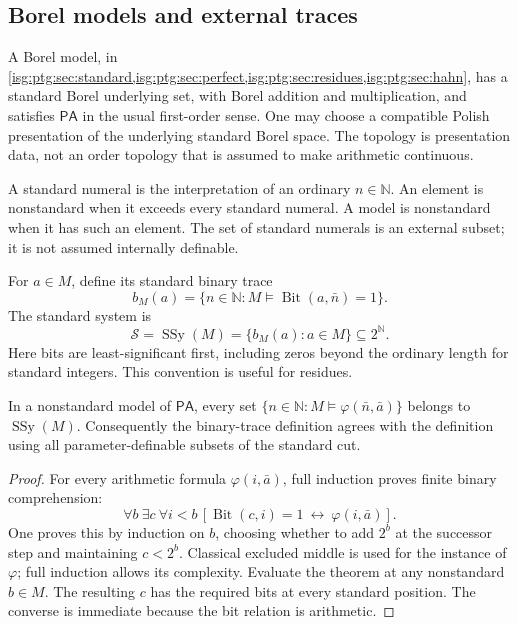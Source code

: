 \documentclass[11pt]{article}
\theoremstyle{definition}
\theoremstyle{remark}
\newcommand{\N}{\mathbb{N}}
\newcommand{\PA}{\mathsf{PA}}
\newcommand{\SSy}{\operatorname{SSy}}
\newcommand{\Bit}{\operatorname{Bit}}
\begin{document}
\subsection{Borel models and external traces}\label{isg:ptg:sec:traces}
A Borel model, in \cref{isg:ptg:sec:standard,isg:ptg:sec:perfect,isg:ptg:sec:residues,isg:ptg:sec:hahn},
has a standard Borel underlying set, with Borel addition and
multiplication, and satisfies $\PA$ in the usual first-order sense. One may
choose a compatible Polish presentation of the underlying standard Borel
space. The topology is presentation data, not an order topology that is
assumed to make arithmetic continuous.

A standard numeral is the interpretation of an ordinary $n\in\N$. An element
is nonstandard when it exceeds every standard numeral. A model is
nonstandard when it has such an element. The set of standard numerals is an
external subset; it is not assumed internally definable.

For $a\in M$, define its standard binary trace
\[
 b_M(a)=\{n\in\N:M\models\Bit(a,\bar n)=1\}.
\]
The standard system is
\[
 \mathcal S=\SSy(M)=\{b_M(a):a\in M\}\subseteq2^\N.
\]
Here bits are least-significant first, including zeros beyond the ordinary
length for standard integers. This convention is useful for residues.

\begin{lemma}\label{isg:ptg:lem:traces}
In a nonstandard model of $\PA$, every set
$\{n\in\N:M\models\varphi(\bar n,\bar a)\}$ belongs to $\SSy(M)$.
Consequently the binary-trace definition agrees with the definition using
all parameter-definable subsets of the standard cut.
\end{lemma}
\begin{proof}
For every arithmetic formula $\varphi(i,\bar a)$, full induction proves
finite binary comprehension:
\[
 \forall b\ \exists c\ \forall i<b\,
 [\Bit(c,i)=1\ \longleftrightarrow\ \varphi(i,\bar a)].
\]
One proves this by induction on $b$, choosing whether to add $2^b$ at the
successor step and maintaining $c<2^b$. Classical excluded middle is used
for the instance of $\varphi$; full induction allows its complexity.
Evaluate the theorem at any nonstandard $b\in M$. The resulting $c$ has
the required bits at every standard position. The converse is immediate
because the bit relation is arithmetic.
\end{proof}
\end{document}
